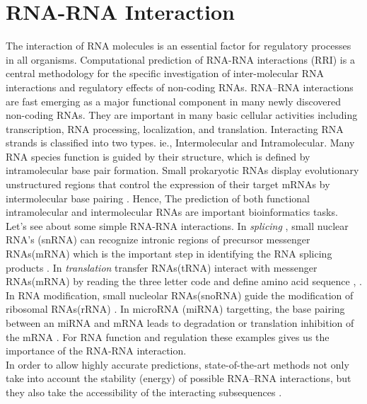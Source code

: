 \documentclass[twoside,a4paper]{report}
\begin{document}
	
	\section{RNA-RNA Interaction}
 	The interaction of RNA molecules is an essential factor for regulatory processes in all organisms. Computational prediction of RNA-RNA interactions (RRI) is a central methodology for the specific investigation of inter-molecular RNA interactions and regulatory effects of non-coding RNAs. RNA–RNA interactions are fast emerging as a major functional component in many newly discovered non-coding RNAs. They are important in many basic cellular activities including transcription, RNA processing, localization, and translation. Interacting RNA strands is classified into two types. ie., Intermolecular and Intramolecular. Many RNA species function is guided by their structure, which is defined by intramolecular base pair formation. Small prokaryotic RNAs display evolutionary unstructured regions that control the expression of their target mRNAs by intermolecular base pairing \citep{wright2013comparative}. Hence, The prediction of both functional intramolecular and intermolecular RNAs are important bioinformatics tasks. \\
 	
 	Let's see about some simple RNA-RNA interactions. In \textit{splicing} , small nuclear RNA's (snRNA) can recognize intronic regions of precursor messenger RNAs(mRNA) which is the important step in identifying the RNA splicing products \citep{modrek2002genomic}. In \textit{translation} transfer RNAs(tRNA) interact with messenger RNAs(mRNA) by reading the three letter code and define amino acid sequence \citep{selmer2006structure}, \citep{ibba2000aminoacyl}. In RNA modification, small nucleolar RNAs(snoRNA) guide the modification of ribosomal RNAs(rRNA) \citep{kiss2002small}. In microRNA (miRNA) targetting, the base pairing between an miRNA and mRNA leads to degradation or translation inhibition of the mRNA \citep{bartel2004micrornas}. For RNA function and regulation these examples gives us the importance of the RNA-RNA interaction. \\
 		
 	In order to allow highly accurate predictions, state-of-the-art methods not only take into account the stability (energy) of possible RNA–RNA interactions, but they also take the accessibility of the interacting subsequences \citep{umu2017comprehensive}.\\
 	
\end{document}
